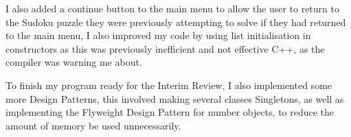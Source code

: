 \documentclass[]{final_report}
\begin{document}
I also added a continue button to the main menu to allow the user to return to the Sudoku puzzle they were previously attempting to solve if they had returned to the main menu, I also improved my code by using list initialisation in constructors as this was previously inefficient and not effective C++, as the compiler was warning me about.

To finish my program ready for the Interim Review, I also implemented some more Design Patterns, this involved making several classes Singletons, as well as implementing the Flyweight Design Pattern for number objects, to reduce the amount of memory be used unnecessarily.

\label{endpage}
\end{document}
